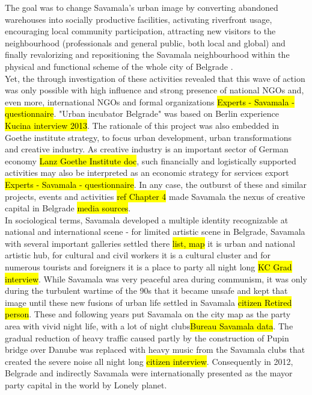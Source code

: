\documentclass[11pt]{report}
\begin{document}
The goal was to change Savamala's urban image by converting  abandoned warehouses into socially productive facilities, activating riverfront usage, encouraging local community participation, attracting new visitors to the neighbourhood (professionals and general public, both local and global) and finally revalorizing and repositioning the Savamala neighbourhood within the physical and functional scheme of the whole city of Belgrade \cite{Cvetinovic et al 2013}.
\\
Yet, the through investigation of these activities revealed that this wave of action was only possible with high influence and strong presence of national NGOs and, even more, international NGOs and formal organizations \hl{Experts - Savamala - questionnaire}.
"Urban incubator Belgrade" was based on Berlin experience \hl{Kucina interview 2013}. The rationale of this project was also embedded in Goethe institute strategy, to focus urban development, urban transformations and creative industry. As creative industry is an important sector of German economy \hl{Lanz Goethe Institute doc}, such financially and logistically supported activities may also be interpreted as an economic strategy for services export \hl{Experts - Savamala - questionnaire}. In any case, the outburst of these and similar projects, events and activities \hl{ref Chapter 4} made Savamala the nexus of creative capital in Belgrade \hl{media sources}.
\\
In sociological terms, Savamala developed a multiple identity recognizable at national and international scene - for limited artistic scene in Belgrade, Savamala with several important galleries settled there \hl{list, map} it is urban and national artistic hub, for cultural and civil workers it is a cultural cluster and for numerous tourists and foreigners it is a place to party all night long \hl{KC Grad interview}.
While Savamala was very peaceful area during communism\footnotemark, it was only during the turbulent wartime of the 90s that it became unsafe and kept that image until these new fusions of urban life settled in Savamala \hl{citizen Retired person}.
These and following years put Savamala on the city map as the party area with vivid night life, with a lot of night clubs\footnotemark \hl{Bureau Savamala data}.
The gradual reduction of heavy traffic caused partly by the construction of Pupin bridge over Danube was replaced with heavy music from the Savamala clubs that created the severe noise all night long \hl{citizen interview}.
Consequently in 2012, Belgrade and indirectly Savamala were internationally presented as the mayor party capital in the world by Lonely planet\cite{Lonely planet}.
\end{document}
